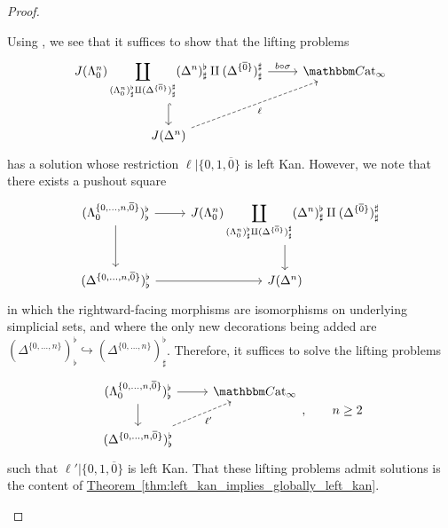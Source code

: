 \documentclass[main.tex]{subfiles}
\begin{document}
\begin{proof}
\begin{enumerate}
      Using \cite[Prop.~A.2.3.1]{highertopostheory}, we see that it suffices to show that the lifting problems
      \begin{equation*}
        \begin{tikzcd}
          J(\Lambda^{n}_{0}) \displaystyle\coprod_{(\Lambda^{n}_{0})^{\flat}_{\sharp} \amalg (\Delta^{\{\overline{0}\}})^{\sharp}_{\sharp}}(\Delta^{n})^{\flat}_{\sharp} \amalg (\Delta^{\{\overline{0}\}})^{\sharp}_{\sharp}
          \arrow[r, "b \circ \sigma"]
          \arrow[d, hook]
          & \ICCat
          \\
          J(\Delta^{n})
          \arrow[ur, dashed, swap, "\ell"]
        \end{tikzcd}
      \end{equation*}
      has a solution whose restriction $\ell|\{0,1,\overline{0}\}$ is left Kan. However, we note that there exists a pushout square
      \begin{equation*}
        \begin{tikzcd}
          (\Lambda^{\{0, \ldots, n, \overline{0}\}}_{0})^{\flat}_{\flat}
          \arrow[r]
          \arrow[d]
          & J(\Lambda^{n}_{0}) \displaystyle\coprod_{(\Lambda^{n}_{0})^{\flat}_{\sharp} \amalg (\Delta^{\{\overline{0}\}})^{\sharp}_{\sharp}}(\Delta^{n})^{\flat}_{\sharp} \amalg (\Delta^{\{\overline{0}\}})^{\sharp}_{\sharp}
          \arrow[d]
          \\
          (\Delta^{\{0, \ldots, n, \overline{0}\}})^{\flat}_{\flat}
          \arrow[r]
          & J(\Delta^{n})
        \end{tikzcd}
      \end{equation*}
      in which the rightward-facing morphisms are isomorphisms on underlying simplicial sets, and where the only new decorations being added are $(\Delta^{\{0, \ldots, n\}})^{\flat}_{\flat} \hookrightarrow (\Delta^{\{0, \ldots, n\}})^{\flat}_{\sharp}$. Therefore, it suffices to solve the lifting problems
      \begin{equation*}
        \begin{tikzcd}
          (\Lambda^{\{0, \ldots, n, \overline{0}\}}_{0})^{\flat}_{\flat}
          \arrow[r]
          \arrow[d]
          & \ICCat
          \\
          (\Delta^{\{0, \ldots, n, \overline{0}\}})^{\flat}_{\flat}
          \arrow[ur, dashed, swap, "\ell'"]
        \end{tikzcd},\qquad n \geq 2
      \end{equation*}
      such that $\ell'|\{0,1,\overline{0}\}$ is left Kan. That these lifting problems admit solutions is the content of \hyperref[thm:left_kan_implies_globally_left_kan]{Theorem~\ref*{thm:left_kan_implies_globally_left_kan}}.


\end{enumerate}
\end{proof}
\end{document}
